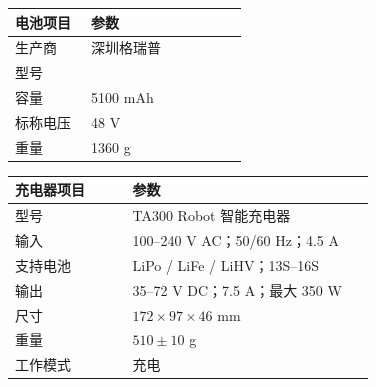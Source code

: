\begingroup\small\renewcommand{\arraystretch}{1.15}
\begin{longtable}{@{}P{0.3\linewidth}P{0.62\linewidth}@{}}
\toprule
\textbf{电池项目} & \textbf{参数} \\
\midrule\endhead
生产商 & 深圳格瑞普 \\
型号 &  \\
容量 & 5100 mAh \\
标称电压 & 48 V \\
重量 & 1360 g \\
\bottomrule\end{longtable}\endgroup

\begingroup\small\renewcommand{\arraystretch}{1.15}
\begin{longtable}{@{}P{0.3\linewidth}P{0.62\linewidth}@{}}
\toprule
\textbf{充电器项目} & \textbf{参数} \\
\midrule\endhead
型号 & TA300 Robot 智能充电器 \\
输入 & 100--240 V AC；50/60 Hz；4.5 A \\
支持电池 & LiPo / LiFe / LiHV；13S--16S \\
输出 & 35--72 V DC；7.5 A；最大 350 W \\
尺寸 & $172\times97\times46$ mm \\
重量 & $510\pm10$ g \\
工作模式 & 充电 \\
\bottomrule\end{longtable}\endgroup
